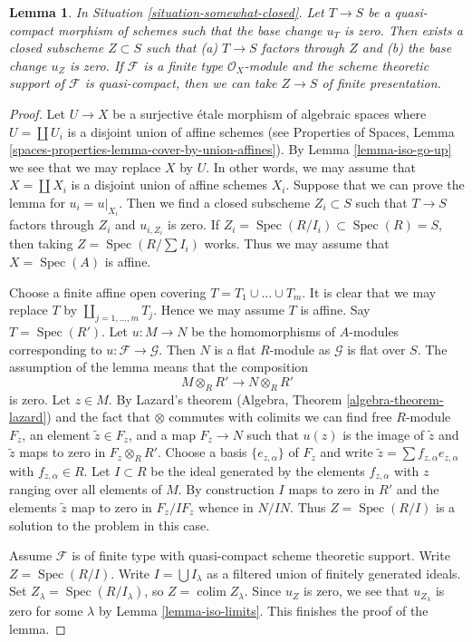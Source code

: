 \documentclass{stacks-project}
\theoremstyle{plain}
\newtheorem{lemma}[subsection]{Lemma}
\theoremstyle{definition}
\theoremstyle{remark}
\numberwithin{equation}{subsection}
\def\colim{\mathop{\mathrm{colim}}\nolimits}
\def\Spec{\mathop{\mathrm{Spec}}}
\begin{document}
\begin{lemma}
\label{lemma-F-zero-somewhat-closed}
In Situation \ref{situation-somewhat-closed}. Let $T \to S$
be a quasi-compact morphism of schemes such that the base change $u_T$ is
zero. Then exists a closed subscheme $Z \subset S$ such that
(a) $T \to S$ factors through $Z$ and (b) the base change $u_Z$ is zero.
If $\mathcal{F}$ is a finite type $\mathcal{O}_X$-module and
the scheme theoretic support of $\mathcal{F}$ is quasi-compact,
then we can take $Z \to S$ of finite presentation.
\end{lemma}

\begin{proof}
Let $U \to X$ be a surjective \'etale morphism of algebraic spaces
where $U = \coprod U_i$ is a disjoint union of affine schemes (see
Properties of Spaces, Lemma
\ref{spaces-properties-lemma-cover-by-union-affines}).
By Lemma \ref{lemma-iso-go-up} we see that we may
replace $X$ by $U$. In other words, we may assume that $X = \coprod X_i$
is a disjoint union of affine schemes $X_i$. Suppose that we can prove
the lemma for $u_i = u|_{X_i}$. Then we find a closed subscheme
$Z_i \subset S$ such that $T \to S$ factors through $Z_i$ and
$u_{i, Z_i}$ is zero. If
$Z_i = \Spec(R/I_i) \subset \Spec(R) = S$, then taking
$Z = \Spec(R/\sum I_i)$ works. Thus we may assume that
$X = \Spec(A)$ is affine.

\medskip\noindent
Choose a finite affine open covering $T = T_1 \cup \ldots \cup T_m$.
It is clear that we may replace $T$ by $\coprod_{j = 1, \ldots, m} T_j$.
Hence we may assume $T$ is affine. Say $T = \Spec(R')$.
Let $u : M \to N$ be the homomorphisms of $A$-modules
corresponding to $u : \mathcal{F} \to \mathcal{G}$.
Then $N$ is a flat $R$-module as $\mathcal{G}$ is flat over $S$.
The assumption of the lemma means that the composition
$$
M \otimes_R R' \to N \otimes_R R'
$$
is zero. Let $z \in M$. By Lazard's theorem
(Algebra, Theorem \ref{algebra-theorem-lazard}) and the fact
that $\otimes$ commutes with colimits we can find free $R$-module
$F_z$, an element $\tilde z \in F_z$, and a map $F_z \to N$ such that
$u(z)$ is the image of $\tilde z$ and $\tilde z$ maps to zero in
$F_z \otimes_R R'$. Choose a basis $\{e_{z, \alpha}\}$ of $F_z$ and write
$\tilde z = \sum f_{z, \alpha} e_{z, \alpha}$ with $f_{z, \alpha} \in R$.
Let $I \subset R$ be the ideal generated by the elements $f_{z, \alpha}$
with $z$ ranging over all elements of $M$.
By construction $I$ maps to zero in $R'$ and the elements $\tilde z$
map to zero in $F_z/IF_z$ whence in $N/IN$. Thus $Z = \Spec(R/I)$
is a solution to the problem in this case.

\medskip\noindent
Assume $\mathcal{F}$ is of finite type with quasi-compact scheme
theoretic support. Write $Z = \Spec(R/I)$.
Write $I = \bigcup I_\lambda$ as a filtered union of finitely generated
ideals. Set $Z_\lambda = \Spec(R/I_\lambda)$, so $Z = \colim Z_\lambda$.
Since $u_Z$ is zero, we see that $u_{Z_\lambda}$ is zero
for some $\lambda$ by Lemma \ref{lemma-iso-limits}.
This finishes the proof of the lemma.
\end{proof}
\end{document}
